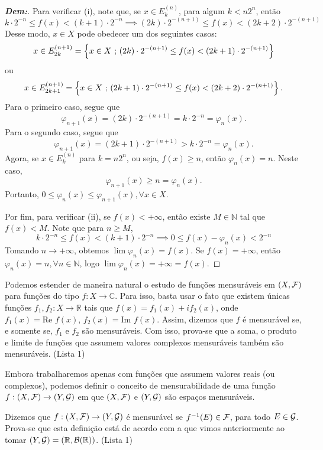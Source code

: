 \begin{proof}[\textbf{Dem:}]
\noindent
  Para verificar (i), note que,  
  se $x \in E_k^{(n)}$, para algum $k < n2^n$, então 
$$ k \cdot 2^{-n} \le f(x) < (k+1) \cdot 2^{-n} \implies
  (2k) \cdot 2^{-(n+1)} \le f(x) < (2k+2) \cdot 2^{-(n+1)} $$ %
  Desse modo, $x \in X$ pode obedecer um dos seguintes casos: 
  $$x \in E_{2k}^{(n+1)} = 
  \left\{x \in X \text{ ; } (2k) \cdot 2^{-(n+1)} \le f(x) < (2k+1) \cdot 2^{-(n+1)}\right\}$$
  ou
   $$x \in E_{2k+1}^{(n+1)} = 
  \left\{x \in X \text{ ; } (2k+1) \cdot 2^{-(n+1)} \le f(x) < (2k+2) \cdot 2^{-(n+1)}\right\}.$$
Para o primeiro caso, segue que 
  $$\varphi_{n+1}(x) = (2k) \cdot 2^{-(n+1)} = k \cdot 2^{-n} = \varphi_n(x).$$
Para o segundo caso, segue que 
  $$\varphi_{n+1}(x) =
  (2k+1) \cdot 2^{-(n+1)} > k \cdot 2^{-n} = \varphi_n(x).$$
Agora, se $x \in E_{k}^{(n)}$ para $k = n2^n$,  ou seja, $f(x) \ge n$, então $\varphi_n(x) = n$.
  Neste caso, $$\varphi_{n+1}(x) \ge n = \varphi_n(x).$$
Portanto, $0 \le \varphi_n(x) \le \varphi_{n+1}(x), \forall x \in X$. %

\noindent
  Por fim, para verificar (ii), se $f(x) < +\infty$, então existe $M \in \mathbb{N}$ 
  tal que $f(x) < M$. Note que para $n \ge M$, %
$$ k \cdot 2^{-n} \le f(x) < (k+1) \cdot 2^{-n} \implies 0 \le f(x) - \varphi_n(x) < 2^{-n} $$ %
Tomando $n \rightarrow +\infty$, obtemos $\lim \varphi_n(x) = f(x)$. %
Se $f(x) = +\infty$, então $\varphi_n(x) = n, \forall n \in \mathbb{N}$, logo $\lim \varphi_n(x) = +\infty = f(x)$. %
\end{proof}


Podemos estender de maneira natural o estudo de funções mensuráveis em $(X,\mathcal{F})$ para funções do tipo $f: X \rightarrow \mathbb{C}$. %
Para isso, basta usar o fato que existem únicas funções $f_1, f_2: X \rightarrow \mathbb{R}$ tais que $f(x) = f_1(x) + i f_2(x)$, onde $f_1(x) = \text{Re } f(x)$, $f_2(x) = \text{Im } f(x)$. %
Assim, dizemos que $f$ é mensurável se, e somente se, $f_1$ e $f_2$ são mensuráveis. %
Com isso, prova-se que a soma, o produto e limite de funções que assumem valores complexos mensuráveis também são mensuráveis. (Lista 1) %


Embora trabalharemos apenas com funções que assumem valores reais (ou complexos), podemos definir o conceito de mensurabilidade de uma função $f: (X,\mathcal{F}) \rightarrow (Y,\mathcal{G})$ em que $(X,\mathcal{F})$ e $(Y,\mathcal{G})$ são espaços mensuráveis. %

Dizemos que $f: (X,\mathcal{F}) \rightarrow (Y,\mathcal{G})$ é mensurável se $f^{-1}(E) \in \mathcal{F}$, para todo $E \in \mathcal{G}$. %
Prova-se que esta definição está de acordo com a que vimos anteriormente ao tomar $(Y,\mathcal{G}) = (\mathbb{R}, \mathcal{B}(\mathbb{R}))$. (Lista 1) %

\newpage

